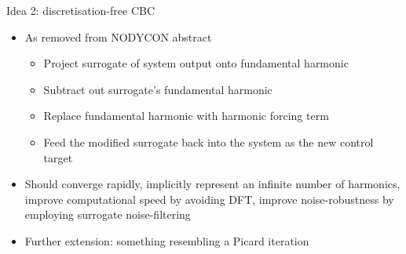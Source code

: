 \documentclass[presentation]{beamer}
\begin{document}
\begin{frame}[<+->][label={sec:orgb85d4ca},plain]{Idea 2: discretisation-free CBC}
\begin{itemize}
\item As removed from NODYCON abstract
\begin{itemize}
\item Project surrogate of system output onto fundamental harmonic
\item Subtract out surrogate's fundamental harmonic
\item Replace fundamental harmonic with harmonic forcing term
\item Feed the modified surrogate back into the system as the new control target
\end{itemize}
\end{itemize}
\vfill
\begin{itemize}
\item Should converge rapidly, implicitly represent an infinite number of harmonics, improve computational speed by avoiding DFT, improve noise-robustness by employing surrogate noise-filtering
\end{itemize}

\vfill
\begin{itemize}
\item Further extension: something resembling a Picard iteration
\end{itemize}
\end{frame}
\end{document}
